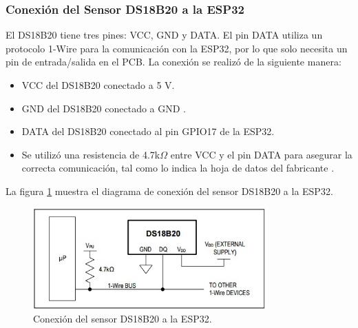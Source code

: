 \subsubsection{Conexión del Sensor DS18B20 a la ESP32}
El DS18B20 tiene tres pines: VCC, GND y DATA. El pin DATA utiliza un protocolo 1-Wire para la comunicación con la ESP32, por lo que solo necesita un pin de entrada/salida en el PCB. La conexión se realizó de la siguiente manera:

\begin{itemize}
    \item VCC del DS18B20 conectado a 5 V.
    \item GND del DS18B20 conectado a GND .
    \item DATA del DS18B20 conectado al pin GPIO17 de la ESP32.
    \item Se utilizó una resistencia de 4.7k$\Omega$ entre VCC y el pin DATA para asegurar la correcta comunicación, tal como lo indica la hoja de datos del fabricante \citep{Sensor_temp}.
\end{itemize}

La figura \ref{fig:conexionTemperatura} muestra el diagrama de conexión del sensor DS18B20 a la ESP32.

\begin{figure}[h]
    \centering
    \includegraphics[width=0.8\textwidth]{./Figures/Pruebas/conexion_ds18b20.png}
    \caption{Conexión del sensor DS18B20 a la ESP32.}
    \label{fig:conexionTemperatura}
\end{figure}

